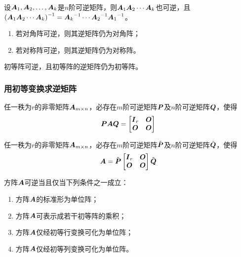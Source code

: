 \documentclass{ctexart}
\begin{document}
\begin{infer}
    设\({\boldsymbol{A}}_1,{\boldsymbol{A}}_2,\dots,{\boldsymbol{A}}_{k}\)是\(n\)阶可逆矩阵，则\(\boldsymbol{A}_1\boldsymbol{A}_2\cdots\boldsymbol{A}_k\)也可逆，且\({\left( \boldsymbol{A}_1\boldsymbol{A}_2\cdots\boldsymbol{A}_k \right)}^{-1}={\boldsymbol{A}_k}^{-1}\cdots{\boldsymbol{A}_2}^{-1}{\boldsymbol{A}_1}^{-1}\)。
\end{infer}

\begin{property}
    \begin{enumerate}
        \item 若对角阵可逆，则其逆矩阵仍为对角阵；
        \item 若对称阵可逆，则其逆矩阵仍为对称阵。
    \end{enumerate}
\end{property}

\begin{theorem}
    初等阵可逆，且初等阵的逆矩阵仍为初等阵。
\end{theorem}

\subsubsection*{用初等变换求逆矩阵}

\begin{theorem}
    任一秩为\(r\)的非零矩阵\(\boldsymbol{A}_{m\times n}\)，必存在\(m\)阶可逆矩阵\(\boldsymbol{P}\)及\(n\)阶可逆矩阵\(\boldsymbol{Q}\)，使得
    \begin{equation*}
        \boldsymbol{P}\boldsymbol{A}\boldsymbol{Q}=\begin{bmatrix}
            \boldsymbol{I}_r & \boldsymbol{O} \\\boldsymbol{O}&\boldsymbol{O}
        \end{bmatrix}
    \end{equation*}
\end{theorem}

\begin{infer}
    任一秩为\(r\)的非零矩阵\(\boldsymbol{A}_{m\times n}\)，必存在\(m\)阶可逆矩阵\(\tilde{\boldsymbol{P}}\)及\(n\)阶可逆矩阵\(\tilde{\boldsymbol{Q}}\)，使得
    \begin{equation*}
        \boldsymbol{A}=\tilde{\boldsymbol{P}}\begin{bmatrix}
            \boldsymbol{I}_r & \boldsymbol{O} \\\boldsymbol{O}&\boldsymbol{O}
        \end{bmatrix}\tilde{\boldsymbol{Q}}
    \end{equation*}
\end{infer}

\begin{theorem}
    方阵\(\boldsymbol{A}\)可逆当且仅当下列条件之一成立：
    \begin{enumerate}
        \item 方阵\(\boldsymbol{A}\)的标准形为单位阵；
        \item 方阵\(\boldsymbol{A}\)可表示成若干初等阵的乘积；
        \item 方阵\(\boldsymbol{A}\)仅经初等行变换可化为单位阵；
        \item 方阵\(\boldsymbol{A}\)仅经初等列变换可化为单位阵。
    \end{enumerate}
\end{theorem}
\end{document}
